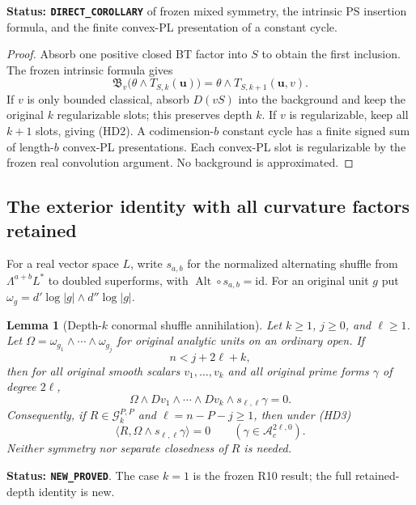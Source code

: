 \documentclass[11pt,a4paper]{article}
\numberwithin{equation}{section}
\newtheorem{lemma}[theorem]{Lemma}
\theoremstyle{definition}
\theoremstyle{remark}
\begin{document}
\noindent\textbf{Status: \texttt{DIRECT\_COROLLARY}} of frozen
mixed symmetry, the intrinsic PS insertion formula, and the finite
convex-PL presentation of a constant cycle.

\begin{proof}
Absorb one positive closed BT factor into $S$ to obtain the first
inclusion. The frozen intrinsic formula gives
\[
 \mathfrak B_v\bigl(\theta\wedge T_{S,k}(\mathbf u)\bigr)
             =\theta\wedge T_{S,k+1}(\mathbf u,v).
\]
If $v$ is only bounded classical, absorb $D(vS)$ into the background
and keep the original $k$ regularizable slots; this preserves depth
$k$. If $v$ is regularizable, keep all $k+1$ slots, giving (HD2).
A codimension-$b$ constant cycle has a finite signed sum of length-$b$
convex-PL presentations. Each convex-PL slot is regularizable by the
frozen real convolution argument. No background is approximated.
\end{proof}

\subsection{The exterior identity with all curvature factors retained}

For a real vector space $L$, write $s_{a,b}$ for the normalized
alternating shuffle from $\Lambda^{a+b}L^*$ to doubled superforms,
with $\operatorname{Alt}\circ s_{a,b}=\mathrm{id}$.
For an original unit $g$ put
$\omega_g=d'\log|g|\wedge d''\log|g|$.

\begin{lemma}[Depth-$k$ conormal shuffle annihilation]
\label{lem:r12-depth-shuffle}
Let $k\ge1$, $j\ge0$, and $\ell\ge1$. Let
$\Omega=\omega_{g_1}\wedge\cdots\wedge\omega_{g_j}$ for original
analytic units on an ordinary open. If
\[
                              n<j+2\ell+k,
 \tag{HD3}
\]
then for all original smooth scalars $v_1,\ldots,v_k$ and all
original prime forms $\gamma$ of degree $2\ell$,
\[
       \Omega\wedge Dv_1\wedge\cdots\wedge Dv_k
                                      \wedge s_{\ell,\ell}\gamma=0.
 \tag{HD4}
\]
Consequently, if $R\in\mathscr G_k^{P,P}$ and
$\ell=n-P-j\ge1$, then under (HD3)
\[
                 \langle R,\Omega\wedge s_{\ell,\ell}\gamma\rangle=0
                         \qquad(\gamma\in\mathscr A_c^{2\ell,0}).
 \tag{HD5}
\]
Neither symmetry nor separate closedness of $R$ is needed.
\end{lemma}

\noindent\textbf{Status: \texttt{NEW\_PROVED}}. The case $k=1$
is the frozen R10 result; the full retained-depth identity is new.
\end{document}

